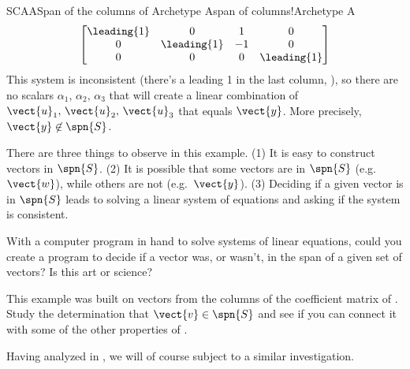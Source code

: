 \begin{example}{SCAA}{Span of the columns of Archetype A}{span of columns!Archetype A}
\begin{align*}
%
\begin{bmatrix}
\leading{1} & 0 & 1 & 0\\
0 & \leading{1} & -1 & 0\\
0 & 0 & 0 & \leading{1}
\end{bmatrix}
\end{align*}
%
This system is inconsistent (there's a leading 1 in the last column, ), so there are no scalars $\alpha_1,\,\alpha_2,\,\alpha_3$ that will create a linear combination of $\vect{u}_1,\,\vect{u}_2,\,\vect{u}_3$ that equals $\vect{y}$.  More precisely, $\vect{y}\not\in\spn{S}$.\par
%
There are three things to observe in this example.  (1) It is easy to construct vectors in $\spn{S}$.  (2) It is possible that some vectors are in $\spn{S}$ (e.g.\ $\vect{w}$), while others are not (e.g.\ $\vect{y}$).  (3)  Deciding if a given vector is in $\spn{S}$ leads to solving a linear system of equations and asking if the system is consistent.\par
%
With a computer program in hand to solve systems of linear equations, could you create a program to decide if a vector was, or wasn't, in the span of a given set of vectors?  Is this art or science?\par
%
This example was built on vectors from the columns of the coefficient matrix of .  Study the determination that $\vect{v}\in\spn{S}$ and see if you can connect it with some of the other properties of .
%
\end{example}
%
Having analyzed  in , we will of course subject  to a similar investigation.
%
%
